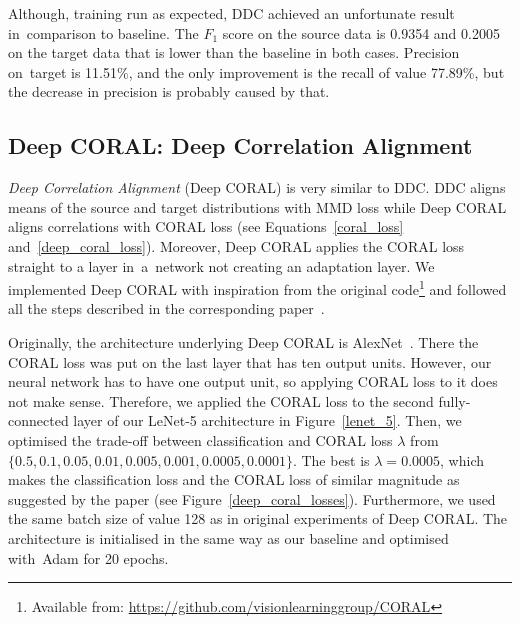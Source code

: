 Although, training run as expected,
DDC achieved an unfortunate result in~comparison to baseline.
The \(F_1\) score on the source data is 0.9354 and 0.2005 on the target data that is lower than the baseline in both cases.
Precision on~target is 11.51\%,
and the only improvement is the recall of value 77.89\%,
but the decrease in precision is probably caused by that.

\subsection{Deep CORAL: Deep Correlation Alignment}

\textit{Deep Correlation Alignment} (Deep CORAL) is very similar to DDC.
DDC aligns means of the source and target distributions with MMD loss
while Deep CORAL aligns correlations with CORAL loss
(see Equations~\ref{coral_loss} and~\ref{deep_coral_loss}).
Moreover, Deep CORAL applies the CORAL loss straight to a layer in~a~network
not creating an adaptation layer.
We implemented Deep CORAL with inspiration from the original
code\footnote{Available from: \url{https://github.com/visionlearninggroup/CORAL}}
and followed all the steps described in the corresponding paper~\cite{sun2016}.

Originally, the architecture underlying Deep CORAL is AlexNet~\cite{krizhevsky2012}.
There the CORAL loss was put on the last layer that has ten output units.
However, our neural network has to have one output unit,
so applying CORAL loss to it does not make sense.
Therefore, we applied the CORAL loss to the second fully-connected layer
of our LeNet-5 architecture in Figure~\ref{lenet_5}.
Then, we optimised the trade-off between classification and CORAL loss
\(\lambda\) from \(\{0.5, 0.1, 0.05, 0.01, 0.005, 0.001, 0.0005, 0.0001\}\).
The best is \(\lambda = 0.0005\),
which makes the classification loss and the CORAL loss of similar magnitude as suggested by the paper
(see Figure~\ref{deep_coral_losses}).
Furthermore, we used the same batch size of value 128
as in original experiments of Deep CORAL.
The architecture is initialised in the same way as our baseline
and optimised with~Adam for 20 epochs.

